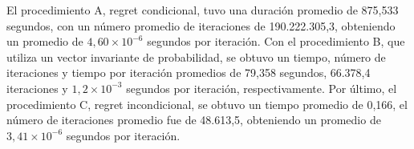  El procedimiento A, regret condicional, tuvo una duración promedio de 875,533 segundos, con un número promedio de iteraciones de 190.222.305,3, obteniendo un promedio de $4,60 {\times} 10^{-6}$ segundos por iteración. Con el procedimiento B, que utiliza un vector invariante de probabilidad, se obtuvo un tiempo, número de iteraciones y tiempo por iteración promedios de 79,358 segundos, 66.378,4 iteraciones y $1,2 {\times} 10^{-3}$ segundos por iteración, respectivamente. Por último, el procedimiento C, regret incondicional, se obtuvo un tiempo promedio de 0,166, el número de iteraciones promedio fue de 48.613,5, obteniendo un promedio de $3,41 {\times} 10^{-6}$ segundos por iteración.
 
